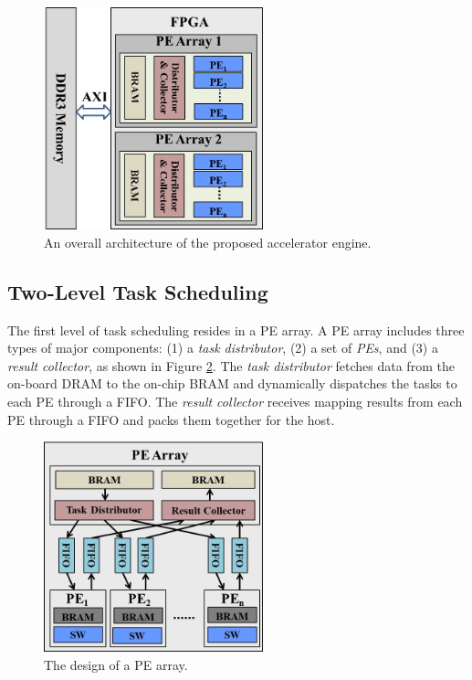 \begin{figure}[!hbt]
\begin{center}
\includegraphics[width=2.5in]{Figures/Figure_Arch1.jpg}
\caption {An overall architecture of the proposed accelerator engine.} \label{fig:overall_architecture} \end{center} \end{figure}
\vspace{-10pt}

\subsection{Two-Level Task Scheduling}

The first level of task scheduling resides in a PE array. 
A PE array includes three types of major components: (1) a \textit{task distributor}, (2) a set of \textit{PEs}, and (3) a \textit{result collector}, 
as shown in Figure \ref{fig:schedule_structure}.
The \textit{task distributor} fetches data from the on-board DRAM to the on-chip BRAM and dynamically dispatches the tasks to each PE through a FIFO.
The \textit{result collector} receives mapping results from each PE through a FIFO and packs them together for the host.

\begin{figure}[!hbt]
\begin{center}
\includegraphics[width=2.5in]{Figures/Figure_Arch2.jpg}
\caption {The design of a PE array.} \label{fig:schedule_structure} \end{center} \end{figure}
\vspace{-10pt}


